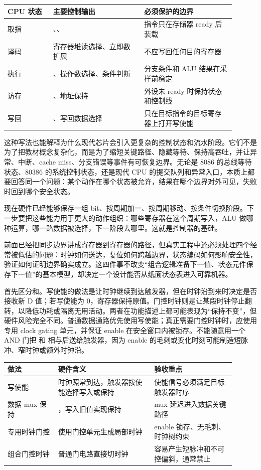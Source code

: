 \begin{longtable}{L{0.18\linewidth}L{0.36\linewidth}L{0.36\linewidth}}
\toprule
CPU 状态 & 主要控制输出 & 必须保护的边界 \\
\midrule
取指 & 、、 & 指令只在存储器 ready 后装载 \\
译码 & 寄存器堆读选择、立即数扩展 & 不应写回任何目的寄存器 \\
执行 & 、操作数选择、条件判断 & 分支条件和 ALU 结果在采样前稳定 \\
访存 & 、地址保持 & 外设未 ready 时保持状态和控制线 \\
写回 & 、写回数据选择 & 只在目标指令的目标寄存器上打开写使能 \\
\bottomrule
\end{longtable}

这种写法也能解释为什么现代芯片会引入更复杂的控制状态和流水阶段。它们不是为了把教材概念复杂化，而是为了缩短关键路径、隐藏等待、保持高吞吐，并让异常、中断、cache miss、分支错误等事件有可恢复边界。无论是 8086 的总线等待状态、80386 的系统控制状态，还是现代 CPU 的提交队列和异常入口，本质上都要回答同一个问题：某个动作在哪个状态被允许，结果在哪个边界对外可见，失败时回到哪个安全状态。

现在硬件已经能够保存一组 bit、按周期加一、按周期移动、按条件切换阶段。下一步要把这些能力用于更大的动作组织：哪些寄存器在这个周期写入，ALU 做哪种运算，哪一路数据被选择，下一阶段去哪里。这就是控制器的基础。


前面已经把同步边界讲成寄存器到寄存器的路径，但真实工程中还必须处理四个经常被低估的问题：时钟如何送达，复位如何跨越边界，状态编码如何影响安全性，验证如何证明边界确实成立。这四件事不改变“组合逻辑准备下一值、状态元件保存下一值”的基本模型，却决定一个设计能否从纸面状态表进入可靠机器。

首先区分和。写使能的做法是让时钟继续到达触发器，但在时钟沿到来时决定是否接收新 D 值；若写使能为 0，寄存器保持原值。门控时钟则是让某段时钟停止翻转，以降低功耗或隔离无用活动。两者在功能描述上都可能表现为“保持不变”，但硬件风险完全不同。普通数据通路优先使用写使能；真正需要门控时钟时，应使用专用 clock gating 单元，并保证 enable 在安全窗口内被锁存。不能随意用一个 AND 门把  和  相与后送给触发器，因为 enable 的毛刺或变化时刻可能制造短脉冲、窄时钟或额外时钟沿。

\begin{longtable}{L{0.2\linewidth}L{0.38\linewidth}L{0.32\linewidth}}
\toprule
做法 & 硬件含义 & 验收重点 \\
\midrule
写使能 & 时钟照常到达，触发器按使能选择写入或保持 & 使能信号必须满足目标触发器时序 \\
数据 mux 保持 & ，写入旧值实现保持 & mux 延迟进入数据关键路径 \\
专用时钟门控 & 使用门控单元生成局部时钟 & enable 锁存、无毛刺、时钟树约束 \\
组合门控时钟 & 普通门电路直接切时钟 & 容易产生短脉冲和不可控偏斜，通常禁止 \\
\bottomrule
\end{longtable}

